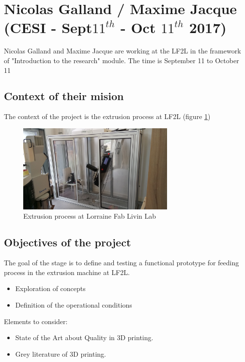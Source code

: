 \section{Nicolas Galland / Maxime Jacque (CESI - Sept$11^{th}$ - Oct $11^{th}$ 2017)}

Nicolas Galland and Maxime Jacque are working at the LF2L in the framework of "Introduction to the research" module.
The time is September 11 to October 11

\subsection{Context of their mision}

The context of the project is the extrusion process at LF2L (figure \ref{Context.Nicolas.Maxime})

\begin{figure}[H]
	\centering
	\includegraphics[width=0.7\textwidth]{Figures/Extrusion/Extruder.jpg}
	\caption{Extrusion process at Lorraine Fab Livin Lab}
	\label{Context.Nicolas.Maxime}
\end{figure}


\subsection{Objectives of the project}


The goal of the stage is to define and testing a functional prototype for feeding process in the extrusion machine at LF2L.




\begin{itemize}
	\item Exploration of concepts
	\item Definition of the operational conditions
\end{itemize}


Elements to consider:

\begin{itemize}
	\item State of the Art about Quality in 3D printing.
	\item Grey literature of 3D printing. 
\end{itemize}


